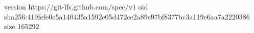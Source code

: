 version https://git-lfs.github.com/spec/v1
oid sha256:419fefe0e5a140435a1592c05d472cc2a89e97bf8377bc3a119e6aa7a2220386
size 165292
